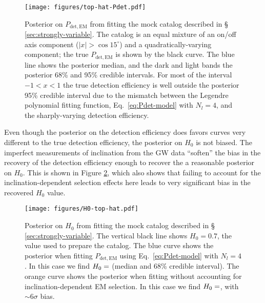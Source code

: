 \documentclass[modern]{aastex631}
\newcommand{\detected}{\mathrm{det}}
\newcommand{\EM}{\mathrm{EM}}
\begin{document}
\begin{figure}
    \texttt{[image: figures/top-hat-Pdet.pdf]}
    \caption{Posterior on $P_{\detected,\EM}$ from fitting the mock catalog
    described in \S\, \ref{sec:strongly-variable}.  The catalog is an equal
    mixture of an on/off axis component ($|x| > \cos 15^\circ$) and a
    quadratically-varying component; the true $P_{\detected,\EM}$ is shown by
    the black curve.  The blue line shows the posterior median, and the dark and
    light bands the posterior 68\% and 95\% credible intervals.  For most of the
    interval $-1 < x < 1$ the true detection efficiency is well outside the
    posterior 95\% credible interval due to the mismatch between the Legendre
    polynomial fitting function, Eq.\ \eqref{eq:Pdet-model} with $N_l = 4$, and
    the sharply-varying detection efficiency.}
    \label{fig:top-hat-Pdet}
\end{figure}

Even though the posterior on the detection efficiency does favors curves very
different to the true detection efficiency, the posterior on $H_0$ is not
biased.  The imperfect measurements of inclination from the GW data ``soften''
the bias in the recovery of the detection efficiency enough to recover the a
reasonable posterior on $H_0$.  This is shown in Figure \ref{fig:H0-top-hat},
which also shows that failing to account for the inclination-dependent selection
effects here leads to very significant bias in the recovered $H_0$ value.

\begin{figure}
    \texttt{[image: figures/H0-top-hat.pdf]}
    \caption{Posterior on $H_0$ from fitting the mock catalog described in \S\,
    \ref{sec:strongly-variable}.  The vertical black line shows $H_0 = 0.7$, the
    value used to prepare the catalog.  The blue curve shows the posterior when
    fitting $P_{\detected,\EM}$ using Eq.\ \eqref{eq:Pdet-model} with $N_l=4$.
    In this case we find $H_0 = \variable{output/H0-top-hat.txt}$ (median and
    68\% credible interval).  The orange curve shows the posterior when fitting
    without accounting for inclination-dependent EM selection.  In this case we
    find $H_0 = \variable{output/H0-top-hat-flat.txt}$, with $\sim 6 \sigma$
    bias.}
    \label{fig:H0-top-hat}
\end{figure}
\end{document}
